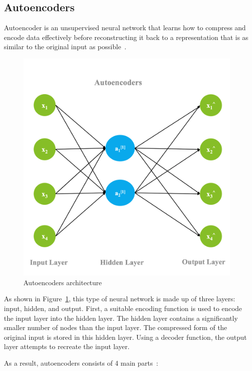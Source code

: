 \subsection{Autoencoders}

Autoencoder is an unsupervised neural network that learns how to compress and encode data effectively before reconstructing it back to a representation that is as similar to the original input as possible~\cite{LopezPinaya2020Autoencoders}.

\begin{figure}[htbp]
    \centering
    \includegraphics[width=0.7\linewidth]{Chapters/Figures/autoencoders.png}
    \caption{Autoencoders architecture~\cite{Madhavan2021DeepDeveloper}}
    \label{fig:autoencoders}
\end{figure}

As shown in Figure~\ref{fig:autoencoders}, this type of neural network is made up of three layers: input, hidden, and output. First, a suitable encoding function is used to encode the input layer into the hidden layer. The hidden layer contains a significantly smaller number of nodes than the input layer. The compressed form of the original input is stored in this hidden layer. Using a decoder function, the output layer attempts to recreate the input layer. 

As a result, autoencoders consists of 4 main parts~\cite{Abirami2020Energy-efficientSystem,LopezPinaya2020Autoencoders}:

